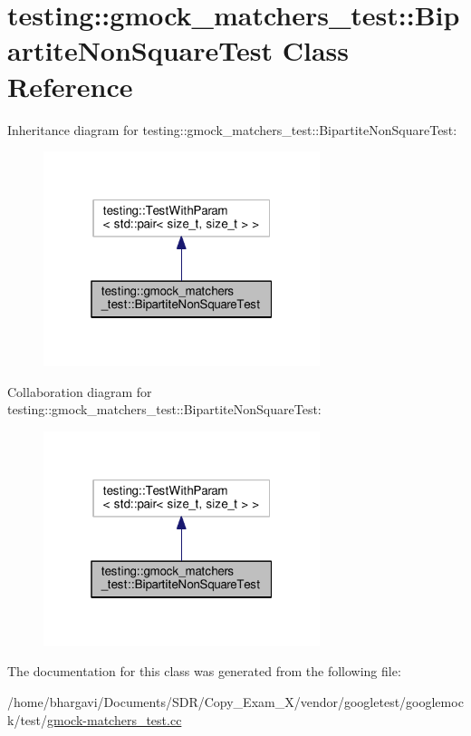 \hypertarget{classtesting_1_1gmock__matchers__test_1_1_bipartite_non_square_test}{}\section{testing\+:\+:gmock\+\_\+matchers\+\_\+test\+:\+:Bipartite\+Non\+Square\+Test Class Reference}
\label{classtesting_1_1gmock__matchers__test_1_1_bipartite_non_square_test}


Inheritance diagram for testing\+:\+:gmock\+\_\+matchers\+\_\+test\+:\+:Bipartite\+Non\+Square\+Test\+:
\nopagebreak
\begin{figure}[H]
\begin{center}
\leavevmode
\includegraphics[width=229pt]{classtesting_1_1gmock__matchers__test_1_1_bipartite_non_square_test__inherit__graph}
\end{center}
\end{figure}


Collaboration diagram for testing\+:\+:gmock\+\_\+matchers\+\_\+test\+:\+:Bipartite\+Non\+Square\+Test\+:
\nopagebreak
\begin{figure}[H]
\begin{center}
\leavevmode
\includegraphics[width=229pt]{classtesting_1_1gmock__matchers__test_1_1_bipartite_non_square_test__coll__graph}
\end{center}
\end{figure}


The documentation for this class was generated from the following file\+:\begin{DoxyCompactItemize}
\item 
/home/bhargavi/\+Documents/\+S\+D\+R/\+Copy\+\_\+\+Exam\+\_\+X/vendor/googletest/googlemock/test/\hyperlink{gmock-matchers__test_8cc}{gmock-\/matchers\+\_\+test.\+cc}\end{DoxyCompactItemize}

